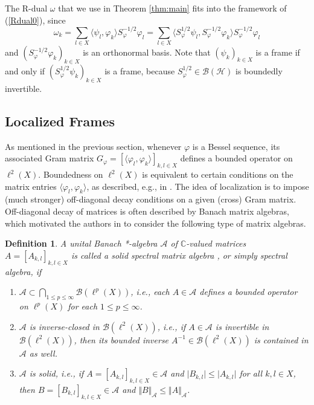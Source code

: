 \documentclass{amsart}
\newtheorem{def.}[theorem]{Definition}
\def\Hil{\mathcal{H}}
\newcommand{\B}[0]{{\mathcal{B}}}
\newcommand{\A}[0]{{\mathcal{A}}}
\begin{document}
The R-dual $\omega$ that we use in Theorem \ref{thm:main} fits into the framework of (\ref{Rdual0}), since
$$\omega_k = \sum_{l\in X}\langle \psi_l , \varphi_k \rangle S_{\varphi}^{- {1}/{2}}\varphi_l = \sum_{l\in X}\langle S_{\varphi}^{ {1}/{2}}\psi_l , S_{\varphi}^{- {1}/{2}}\varphi_k \rangle S_{\varphi}^{- {1}/{2}}\varphi_l$$
and $(S_{\varphi}^{- {1}/{2}}\varphi_k)_{k\in X}$ is an orthonormal basis. Note that $(\psi_k)_{k\in X}$ is a frame if and only if $(S_{\varphi}^{ {1}/{2}}\psi_k)_{k\in X}$ is a frame, because $S_{\varphi}^{ {1}/{2}} \in \B(\Hil)$ is boundedly invertible.

\subsection{Localized Frames}\label{sec:localized-frames}

As mentioned in the previous section, whenever $\varphi$ is a Bessel sequence, its associated Gram matrix $G_{\varphi} = [\langle \varphi_l,\varphi_k\rangle]_{k,l\in X}$ defines a bounded operator on $\ell^2(X)$. Boundedness on $\ell^2(X)$ is equivalent to certain conditions on the matrix entries $\langle \varphi_l,\varphi_k \rangle$, as described, e.g., in \cite[Theorem 4.16]{Maddox:101881}. The idea of localization is to impose (much stronger) off-diagonal decay conditions on a given (cross) Gram matrix. Off-diagonal decay of matrices is often described by Banach matrix algebras, which motivated the authors in \cite{forngroech1} to consider the following type of matrix algebras.

\begin{def.}\label{def:spectral}
A unital Banach *-algebra $\mathcal{A}$ of $\mathbb{C}$-valued matrices $A=[A_{k,l}]_{k,l\in X}$ is called a \emph{solid spectral matrix algebra} \cite[Section~2.3]{forngroech1}, or simply \emph{spectral algebra}, if
\begin{enumerate}
\item [(A1)] $\A \subset \bigcap_{1\leq p\leq \infty} \B(\ell^p(X))$, i.e., each $A \in \mathcal{A}$ defines a bounded operator on $\ell^p (X)$ for each $1\leq p\leq \infty$.
\item[(A2)] $\mathcal{A}$ is \emph{inverse-closed} in $\mathcal{B}(\ell^2 (X))$, i.e., if $A \in \mathcal{A}$ is invertible in $\mathcal{B}(\ell^2(X))$, then its bounded inverse $A^{-1} \in \B(\ell^2(X))$ is contained in $\mathcal{A}$ as well.
\item[(A3)] $\mathcal{A}$ is \emph{solid}, i.e., if $A = [A_{k,l}]_{k,l\in X} \in \mathcal{A}$ and $\vert B_{k,l} \vert \leq \vert A_{k,l} \vert$ for all $k,l \in X$, then $B = [B_{k,l}]_{k,l\in X} \in \mathcal{A}$ and $\Vert B \Vert_{\mathcal{A}} \leq \Vert A \Vert_{\mathcal{A}}$. 
\end{enumerate}
\label{eq:Spektrale-Matrix-Algebra}
\end{def.}
\end{document}
